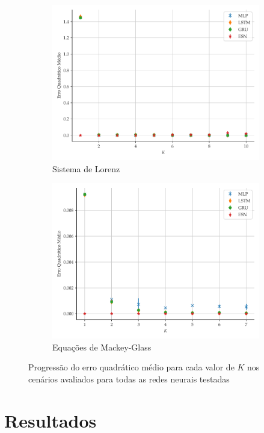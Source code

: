 \documentclass{article}
\begin{document}
\begin{figure}[H]
\begin{subfigure}[t]{0.2\textwidth}
         \includegraphics[scale=0.2]{progressao-k-lorenz.pdf}
         \caption{Sistema de Lorenz}
     \end{subfigure}
     \centering
     \begin{subfigure}[t]{0.2\textwidth} 
         \includegraphics[scale=0.2]{progressao-k-mackeyglass.pdf}
         \caption{Equações de Mackey-Glass}
     \end{subfigure}  
     \centering   
     \caption{Progressão do erro quadrático médio para cada valor de $K$ nos cenários avaliados para todas as redes neurais testadas}
     \label{fig:mse-progression}
\end{figure}

\section{Resultados}
\end{document}
